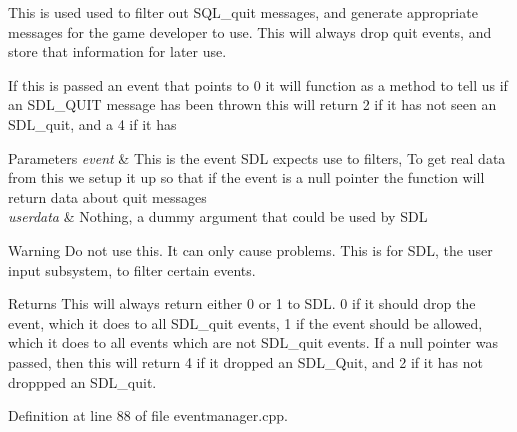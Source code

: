 This is used used to filter out SQL\_\-quit messages, and generate appropriate messages for the game developer to use. This will always drop quit events, and store that information for later use. \par
 If this is passed an event that points to 0 it will function as a method to tell us if an SDL\_\-QUIT message has been thrown this will return 2 if it has not seen an SDL\_\-quit, and a 4 if it has 
\begin{DoxyParams}{Parameters}
{\em event} & This is the event SDL expects use to filters, To get real data from this we setup it up so that if the event is a null pointer the function will return data about quit messages \\
\hline
{\em userdata} & Nothing, a dummy argument that could be used by SDL \\
\hline
\end{DoxyParams}
\begin{DoxyWarning}{Warning}
Do not use this. It can only cause problems. This is for SDL, the user input subsystem, to filter certain events. 
\end{DoxyWarning}
\begin{DoxyReturn}{Returns}
This will always return either 0 or 1 to SDL. 0 if it should drop the event, which it does to all SDL\_\-quit events, 1 if the event should be allowed, which it does to all events which are not SDL\_\-quit events. If a null pointer was passed, then this will return 4 if it dropped an SDL\_\-Quit, and 2 if it has not droppped an SDL\_\-quit. 
\end{DoxyReturn}


Definition at line 88 of file eventmanager.cpp.

